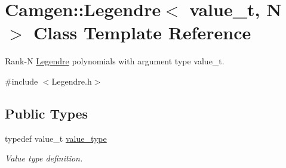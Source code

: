 \hypertarget{a00319}{\section{Camgen\-:\-:Legendre$<$ value\-\_\-t, N $>$ Class Template Reference}
\label{a00319}
}


Rank-\/\-N \hyperlink{a00319}{Legendre} polynomials with argument type value\-\_\-t.  




{\ttfamily \#include $<$Legendre.\-h$>$}

\subsection*{Public Types}
\begin{DoxyCompactItemize}
\item 
\hypertarget{a00319_a6eb9a63823f5074b09c8c916818d94e7}{typedef value\-\_\-t \hyperlink{a00319_a6eb9a63823f5074b09c8c916818d94e7}{value\-\_\-type}}\label{a00319_a6eb9a63823f5074b09c8c916818d94e7}

\begin{DoxyCompactList}\small\item\em Value type definition. \end{DoxyCompactList}\end{DoxyCompactItemize}
